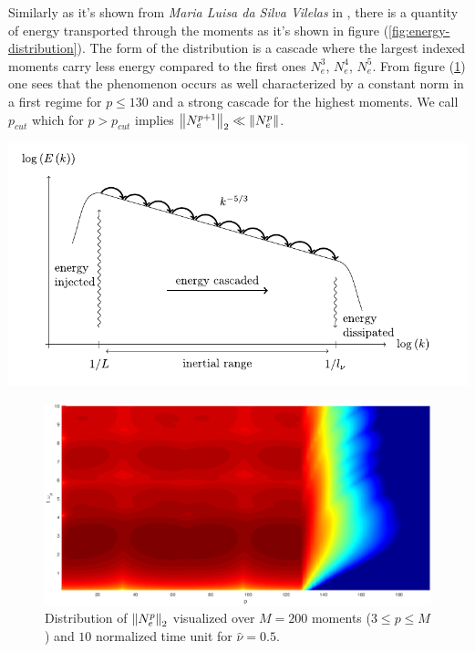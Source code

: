\documentclass[final]{jpp}
\begin{document}
\noindent
\begin{minipage}{\textwidth}
\begin{minipage}{0.45\textwidth}
Similarly as it's shown from \textit{Maria Luisa da Silva Vilelas} in \cite{thesis}, there is a quantity of energy transported through the moments as it's shown in figure (\ref{fig:energy-distribution}). 
The form of the distribution is a cascade where the largest indexed moments carry less energy compared to the first ones $N_e^3$, $N_e^4$, $N_e^5$. From figure (\ref{fig:mom-distrib}) one sees that the phenomenon occurs as well characterized by a constant norm in a first regime for $p \le 130$ and a strong cascade for the highest moments. We call $p_{cut}$ which for $p > p_{cut}$ implies $\left\lVert N_e^{p+1}\right\rVert_2 \ll \left\lVert N_e^p\right\rVert$.
\end{minipage}
\hspace{0.05\textwidth}
\begin{minipage}{0.48\textwidth}
\includegraphics[width=\textwidth]{energy_distribution.pdf}
\label{fig:energy-distribution}
\end{minipage}
\end{minipage}

\begin{figure}
\includegraphics[width=\textwidth]{nu=0.5_mod.eps}
\caption{Distribution of $\left\lVert N_e^p\right\rVert_2$ visualized over $M = 200$ moments ($3 \le p \le M$) and $10$ normalized time unit for $\hat{\nu} = 0.5$.}
\label{fig:mom-distrib}
\end{figure}
\end{document}
